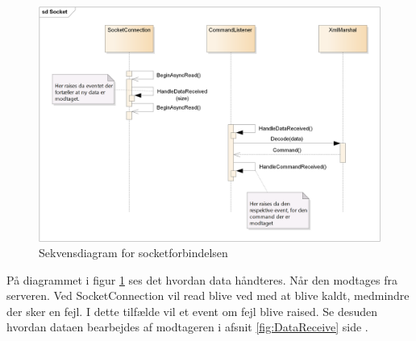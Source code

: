 \begin{figure}[H]
	\centering
	\includegraphics[width=1\textwidth]{Systemdesign/SharedLib/Images/Socket.png}
	\caption{Sekvensdiagram for socketforbindelsen}
	\label{fig:sockit}
\end{figure}

På diagrammet i figur \ref{fig:sockit} ses det hvordan data håndteres. Når den modtages fra serveren. Ved SocketConnection vil read blive ved med at blive kaldt, medmindre der sker en fejl. I dette tilfælde vil et event om fejl blive raised. Se desuden hvordan dataen bearbejdes af modtageren i afsnit \ref{fig:DataReceive} side \pageref{fig:DataReceive}.
 